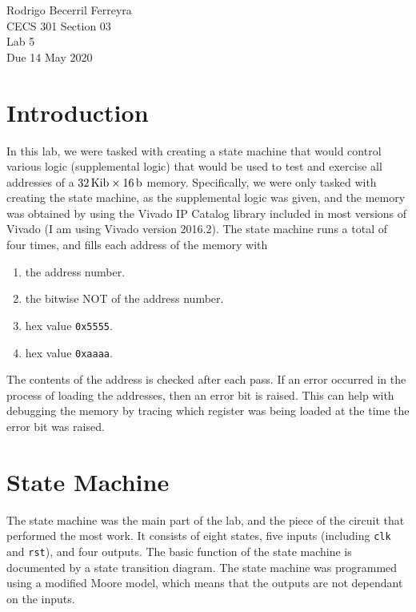 \documentclass{article}
\renewcommand{\c}[1]{\texttt{#1}}
\begin{document}
\begin{flushright}
    \noindent
    Rodrigo Becerril Ferreyra\\
    CECS 301 Section 03\\
    Lab 5\\
    Due 14 May 2020
\end{flushright}

\section{Introduction} In this lab, we were tasked with creating
a state machine that would control various logic
(supplemental logic)
that would
be used to test and exercise all addresses of a
\(\SI{32}{\kibi b} \times \SI{16}{b} \) memory. Specifically,
we were only tasked with creating the state machine, as the
supplemental logic was given, and the memory was obtained by
using the Vivado IP Catalog library included in most versions
of Vivado (I am using Vivado version 2016.2). The state machine
runs a total of four times, and
fills each address of the memory with
\begin{enumerate}
    \item the address number.
    \item the bitwise NOT of the address number.
    \item hex value \c{0x5555}.
    \item hex value \c{0xaaaa}.
\end{enumerate}

The contents of the address is checked after each pass.
If an error occurred in the process of loading the addresses,
then an error bit is raised. This can help with debugging the
memory by tracing which register was being loaded at the time
the error bit was raised.

\section{State Machine} The state machine was the main part of
the lab, and the piece of the circuit that performed the most
work. It consists of eight states, five inputs (including
\c{clk} and \c{rst}), and four outputs. The basic function
of the state machine is documented by a state transition
diagram. The state machine was programmed using a
modified Moore model, which means that the outputs are not
dependant on the inputs.
\end{document}
